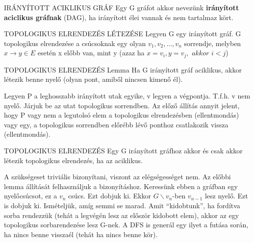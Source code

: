 \begin{definicio}{IRÁNYÍTOTT ACIKLIKUS GRÁF}
Egy G gráfot akkor nevezünk \textbf{irányított aciclikus gráfnak} (DAG), ha irányított élei vannak és nem tartalmaz kört.
\end{definicio}

\begin{definicio}{TOPOLOGIKUS ELRENDEZÉS LÉTEZÉSE}
Legyen G egy irányított gráf. G topologikus elrendezése a csúcsoknak egy olyan $v_1, v_2,..., v_n$ sorrendje, melyben $x\rightarrow y \in E$ esetén x előbb van, mint y (azaz ha $x = v_i, y = v_j,\,\,akkor\,\,i<j$)
\end{definicio}

\begin{tetel}{TOPOLOGIKUS ELRENDEZÉS Lemma}
Ha G irányított gráf aciklikus, akkor létezik benne nyelő (olyan pont, amiből nincsen kimenő él).
\end{tetel}

\begin{bizonyitas}{}
Legyen P a leghosszabb irányított utak egyike, v legyen a végpontja. T.f.h. v nem nyelő. Járjuk be az utat topologikus sorrendben. Az előző állítás annyit jelent, hogy P vagy nem a legutolsó elem a topologikus elrendezésben (ellentmondás) vagy egy, a topologikus sorrendben előrébb lévő ponthoz csatlakozik vissza (ellentmondás).
\end{bizonyitas}

\begin{tetel}{TOPOLOGIKUS ELRENDEZÉS}
Egy G irányított gráfhoz akkor és csak akkor létezik topologikus elrendezés, ha az aciklikus.
\end{tetel}

\begin{bizonyitas}{}
A szükségeset triviális bizonyítani, viszont az elégségességet nem. Az előbbi lemma állítását felhasználjuk a bizonyításhoz. Keressünk ebben a gráfban egy nyelőcsúcsot, ez a $v_n$ csúcs. Ezt dobjuk ki. Ekkor $G\backslash{v_n}$-ben $v_{n-1}$ lesz nyelő. Ezt is dobjuk ki. Ismételjük, amíg semmi se marad. Amit ``kidobtunk'', ha fordítva sorba rendezzük (tehát a legvégén lesz az először kidobott elem), akkor az egy topologikus sorbarendezése lesz G-nek. A DFS is generál egy ilyet a futása során, ha nincs benne visszaél (tehát ha nincs benne kör).
\end{bizonyitas}


